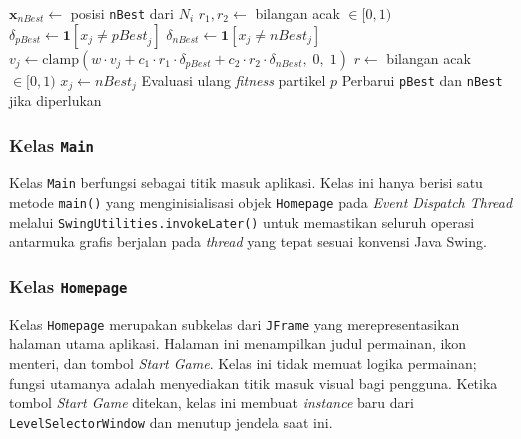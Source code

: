 \begin{algorithm}[!htbp]
	\caption{Prosedur \texttt{updateVelocity} dan \texttt{updateParticles} pada kelas \texttt{PSOSolver}}
	\label{alg:pso-update}
	\begin{algorithmic}[1]
		\State $\mathbf{x}_{\textit{nBest}} \gets$ posisi \texttt{nBest} dari $N_i$
		\State {}
		\State $r_1, r_2 \gets$ bilangan acak $\in [0, 1)$
		\State $\delta_{\textit{pBest}} \gets \mathbf{1}[x_j \neq \textit{pBest}_j]$
		\State $\delta_{\textit{nBest}} \gets \mathbf{1}[x_j \neq \textit{nBest}_j]$
		\State $v_j \gets \text{clamp}(w \cdot v_j + c_1 \cdot r_1 \cdot \delta_{\textit{pBest}} + c_2 \cdot r_2 \cdot \delta_{\textit{nBest}},\; 0,\; 1)$
		\EndFor
		\State {}
		\State $r \gets$ bilangan acak $\in [0, 1)$
		\State $x_j \gets \textit{nBest}_j$
		\EndIf
		\EndFor
		\State Evaluasi ulang \textit{fitness} partikel $p$
		\State Perbarui \texttt{pBest} dan \texttt{nBest} jika diperlukan
		\EndFor
		\EndFor
	\end{algorithmic}
\end{algorithm}

\subsubsection{Kelas \texttt{Main}}
\label{subsubsec:kelas-main}

Kelas \texttt{Main} berfungsi sebagai titik masuk aplikasi. Kelas ini hanya berisi satu metode \texttt{main()} yang menginisialisasi objek \texttt{Homepage} pada \textit{Event Dispatch Thread} melalui \texttt{SwingUtilities.invokeLater()} untuk memastikan seluruh operasi antarmuka grafis berjalan pada \textit{thread} yang tepat sesuai konvensi Java Swing.

\subsubsection{Kelas \texttt{Homepage}}
\label{subsubsec:kelas-homepage}

Kelas \texttt{Homepage} merupakan subkelas dari \texttt{JFrame} yang merepresentasikan halaman utama aplikasi. Halaman ini menampilkan judul permainan, ikon menteri, dan tombol \textit{Start Game}. Kelas ini tidak memuat logika permainan; fungsi utamanya adalah menyediakan titik masuk visual bagi pengguna. Ketika tombol \textit{Start Game} ditekan, kelas ini membuat \textit{instance} baru dari \texttt{LevelSelectorWindow} dan menutup jendela saat ini.

